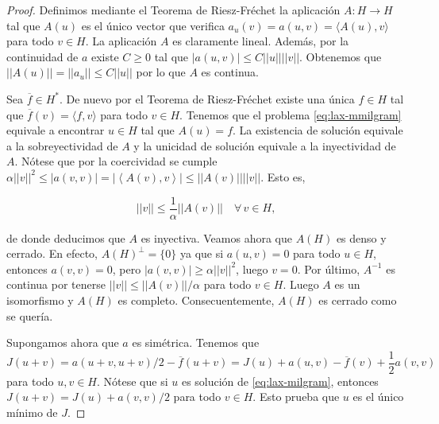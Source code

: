 \documentclass{article}
\begin{document}
\begin{proof}
  Definimos mediante el Teorema de Riesz-Fréchet la aplicación $A \colon H \to H$ tal que $A(u)$ es
  el único vector que verifica $a_u(v) = a(u,v) = \langle A(u), v \rangle$ para todo $v \in H$. La
  aplicación $A$ es claramente lineal. Además, por la continuidad de $a$ existe $C \ge 0$ tal que
  $|a(u,v)| \le C ||u|| ||v ||$. Obtenemos que $||A(u)|| = ||a_u|| \le C ||u||$ por lo que $A$ es
  continua.

  Sea $\overline{f} \in H^*$. De nuevo por el Teorema de Riesz-Fréchet existe una única $f \in H$
  tal que $\overline{f}(v) = \langle f, v\rangle$ para todo $v \in H$. Tenemos que el problema
  \eqref{eq:lax-mmilgram} equivale a encontrar $u\in H$ tal que $A(u) = f$. La existencia de
  solución equivale a la sobreyectividad de $A$ y la unicidad de solución equivale a la inyectividad
  de $A$. Nótese que por la coercividad se cumple
  $\alpha ||v||^2 \le |a(v, v)| = |\left\langle A(v), v \right\rangle| \le ||A(v)||||v||$. Esto es,

  \begin{equation}
    \label{eq:lax-milgram:cota}
    ||v|| \le \frac{1}{\alpha}||A(v)|| \quad \forall\, v \in H,
  \end{equation}
  
  de donde deducimos que $A$ es inyectiva. Veamos ahora que $A(H)$ es denso y cerrado. En efecto,
  $A(H)^\perp = \{0\}$ ya que si $a(u,v) = 0$ para todo $u \in H$, entonces $a(v,v) = 0$, pero
  $|a(v,v)| \ge \alpha ||v||^2$, luego $v = 0$. Por último, $A^{-1}$ es continua por tenerse
  $||v|| \le ||A(v)|| / \alpha$ para todo $v \in H$. Luego $A$ es un isomorfismo y $A(H)$ es
  completo. Consecuentemente, $A(H)$ es cerrado como se quería.

  Supongamos ahora que $a$ es simétrica. Tenemos que
  \[J(u+v) = a(u+v, u+v)/2 - \overline{f}(u+v) = J(u) + a(u,v) - \overline{f}(v) +
    \frac{1}{2}a(v,v)\] para todo $u, v \in H$. Nótese que si $u$ es solución de
  \eqref{eq:lax-milgram}, entonces $J(u+v) = J(u) + a(v,v)/2$ para todo $v \in H$. Esto prueba que
  $u$ es el único mínimo de $J$.
\end{proof}
\end{document}
